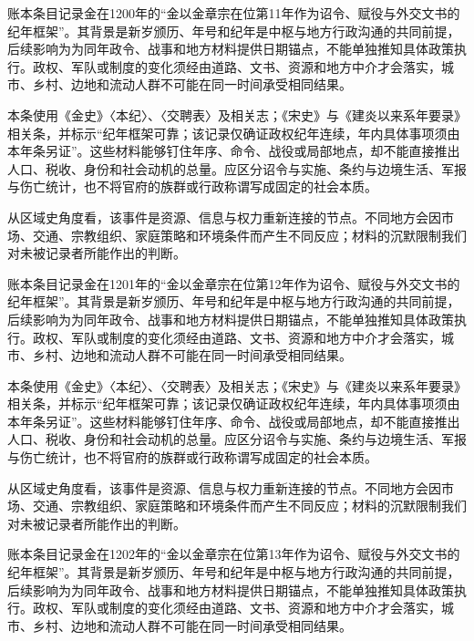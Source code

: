 账本条目记录金在1200年的“金以金章宗在位第11年作为诏令、赋役与外交文书的纪年框架”。其背景是新岁颁历、年号和纪年是中枢与地方行政沟通的共同前提，后续影响为为同年政令、战事和地方材料提供日期锚点，不能单独推知具体政策执行。政权、军队或制度的变化须经由道路、文书、资源和地方中介才会落实，城市、乡村、边地和流动人群不可能在同一时间承受相同结果。

本条使用《金史》〈本纪〉、〈交聘表〉及相关志；《宋史》与《建炎以来系年要录》相关条，并标示“纪年框架可靠；该记录仅确证政权纪年连续，年内具体事项须由本年条另证”。这些材料能够钉住年序、命令、战役或局部地点，却不能直接推出人口、税收、身份和社会动机的总量。应区分诏令与实施、条约与边境生活、军报与伤亡统计，也不将官府的族群或行政称谓写成固定的社会本质。

从区域史角度看，该事件是资源、信息与权力重新连接的节点。不同地方会因市场、交通、宗教组织、家庭策略和环境条件而产生不同反应；材料的沉默限制我们对未被记录者所能作出的判断。

账本条目记录金在1201年的“金以金章宗在位第12年作为诏令、赋役与外交文书的纪年框架”。其背景是新岁颁历、年号和纪年是中枢与地方行政沟通的共同前提，后续影响为为同年政令、战事和地方材料提供日期锚点，不能单独推知具体政策执行。政权、军队或制度的变化须经由道路、文书、资源和地方中介才会落实，城市、乡村、边地和流动人群不可能在同一时间承受相同结果。

本条使用《金史》〈本纪〉、〈交聘表〉及相关志；《宋史》与《建炎以来系年要录》相关条，并标示“纪年框架可靠；该记录仅确证政权纪年连续，年内具体事项须由本年条另证”。这些材料能够钉住年序、命令、战役或局部地点，却不能直接推出人口、税收、身份和社会动机的总量。应区分诏令与实施、条约与边境生活、军报与伤亡统计，也不将官府的族群或行政称谓写成固定的社会本质。

从区域史角度看，该事件是资源、信息与权力重新连接的节点。不同地方会因市场、交通、宗教组织、家庭策略和环境条件而产生不同反应；材料的沉默限制我们对未被记录者所能作出的判断。

账本条目记录金在1202年的“金以金章宗在位第13年作为诏令、赋役与外交文书的纪年框架”。其背景是新岁颁历、年号和纪年是中枢与地方行政沟通的共同前提，后续影响为为同年政令、战事和地方材料提供日期锚点，不能单独推知具体政策执行。政权、军队或制度的变化须经由道路、文书、资源和地方中介才会落实，城市、乡村、边地和流动人群不可能在同一时间承受相同结果。

